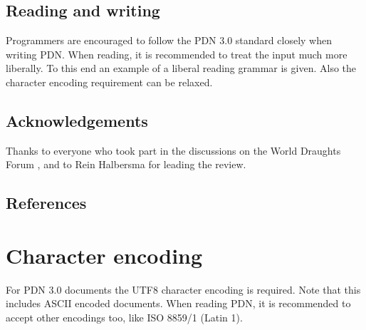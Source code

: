 \documentclass[letterpaper,10pt,english]{sphinxmanual}
\begin{document}
\begin{sphinxVerbatim}[commandchars=\\\{\}]
         
     
\end{sphinxVerbatim}


\section{Reading and writing}
\label{\detokenize{introduction:reading-and-writing}}
\sphinxAtStartPar
Programmers are encouraged to follow the PDN 3.0 standard closely when writing
PDN. When reading, it is recommended to treat the input much more liberally.
To this end an example of a liberal reading grammar is given. Also the character
encoding requirement can be relaxed.


\section{Acknowledgements}
\label{\detokenize{introduction:acknowledgements}}
\sphinxAtStartPar
Thanks to everyone who took part in the discussions on the World Draughts Forum ,
and to Rein Halbersma for leading the review.


\section{References}
\label{\detokenize{introduction:references}}
\sphinxstepscope


\chapter{Character encoding}
\label{\detokenize{encoding:character-encoding}}\label{\detokenize{encoding::doc}}
\sphinxAtStartPar
For PDN 3.0 documents the UTF\sphinxhyphen{}8 character encoding is required. Note that this includes ASCII encoded documents.
When reading PDN, it is recommended to accept other encodings too, like ISO 8859/1 (Latin 1).
\end{document}
